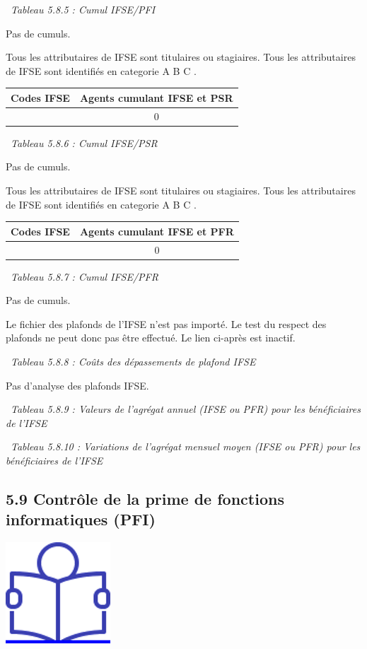 ~\emph{Tableau 5.8.5 : Cumul IFSE/PFI}

Pas de cumuls.

Tous les attributaires de IFSE sont titulaires ou stagiaires. Tous les
attributaires de IFSE sont identifiés en categorie A B C .

\begin{longtable}[]{@{}cc@{}}
\toprule
Codes IFSE & Agents cumulant IFSE et PSR\tabularnewline
\midrule
\endhead
& 0\tabularnewline
\bottomrule
\end{longtable}

~\emph{Tableau 5.8.6 : Cumul IFSE/PSR}

Pas de cumuls.

Tous les attributaires de IFSE sont titulaires ou stagiaires. Tous les
attributaires de IFSE sont identifiés en categorie A B C .

\begin{longtable}[]{@{}cc@{}}
\toprule
Codes IFSE & Agents cumulant IFSE et PFR\tabularnewline
\midrule
\endhead
& 0\tabularnewline
\bottomrule
\end{longtable}

~\emph{Tableau 5.8.7 : Cumul IFSE/PFR}

Pas de cumuls.

Le fichier des plafonds de l'IFSE n'est pas importé. Le test du respect
des plafonds ne peut donc pas être effectué. Le lien ci-après est
inactif.

~\emph{Tableau 5.8.8 : Coûts des dépassements de plafond IFSE}

Pas d'analyse des plafonds IFSE.

~\emph{Tableau 5.8.9 : Valeurs de l'agrégat annuel (IFSE ou PFR) pour
les bénéficiaires de l'IFSE}

~\emph{Tableau 5.8.10 : Variations de l'agrégat mensuel moyen (IFSE ou
PFR) pour les bénéficiaires de l'IFSE}

\hypertarget{controle-de-la-prime-de-fonctions-informatiques-pfi}{%
\subsection{5.9 Contrôle de la prime de fonctions informatiques
(PFI)}\label{controle-de-la-prime-de-fonctions-informatiques-pfi}}

\href{../Docs/Notices/fiche_PFI.odt}{\includegraphics{icones/Notice.png}}

